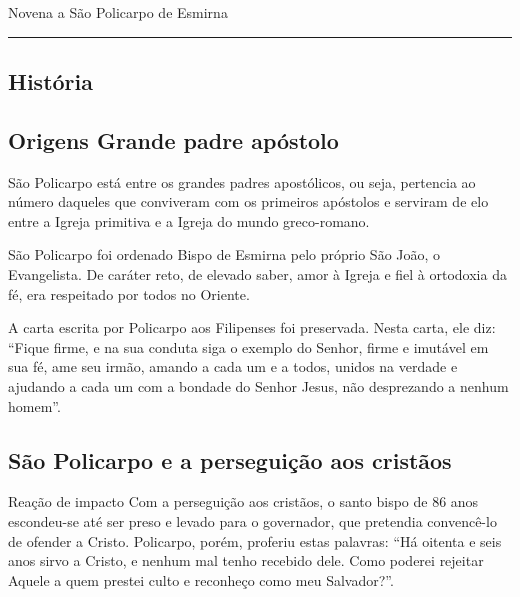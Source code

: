 \documentclass[a4paper,14pt]{extarticle} \usepackage[utf8]{inputenc}
\begin{document}



\begin{center}
  {\huge Novena a São Policarpo de Esmirna}
\end{center}

\noindent\rule{\textwidth}{0.4pt}
\tableofcontents
\thispagestyle{empty}


\newpage
\begin{justify}

 \begin{center}
  \section{História}\label{sec:História} %
 \end{center}


 \begin{justify}
  \subsection{Origens Grande padre apóstolo}
 \end{justify}

São Policarpo está entre os grandes padres apostólicos, ou seja, pertencia ao número daqueles que conviveram com os primeiros apóstolos e serviram de elo entre a Igreja primitiva e a Igreja do mundo greco-romano.

São Policarpo foi ordenado Bispo de Esmirna pelo próprio São João, o Evangelista. De caráter reto, de elevado saber, amor à Igreja e fiel à ortodoxia da fé, era respeitado por todos no Oriente.

A carta escrita por Policarpo aos Filipenses foi preservada. Nesta carta, ele diz: “Fique firme, e na sua conduta siga o exemplo do Senhor, firme e imutável em sua fé, ame seu irmão, amando a cada um e a todos, unidos na verdade e ajudando a cada um com a bondade do Senhor Jesus, não desprezando a nenhum homem”.

\begin{justify}
 \subsection{São Policarpo e a perseguição aos cristãos}
\end{justify}

Reação de impacto
Com a perseguição aos cristãos, o santo bispo de 86 anos escondeu-se até ser preso e levado para o governador, que pretendia convencê-lo de ofender a Cristo. Policarpo, porém, proferiu estas palavras: “Há oitenta e seis anos sirvo a Cristo, e nenhum mal tenho recebido dele. Como poderei rejeitar Aquele a quem prestei culto e reconheço como meu Salvador?”.



\end{justify}
\end{document}
